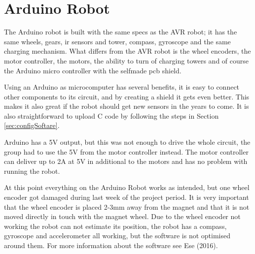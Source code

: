 \section{Arduino Robot}
The Arduino robot is built with the same specs as the AVR robot; it has the same wheels, gears, \acrshort{ir} sensors and tower, compass, gyroscope and the same charging mechanism. What differs from the AVR robot is the wheel encoders, the motor controller, the motors, the ability to turn of charging towers and of course the Arduino micro controller with the selfmade \acrshort{pcb} shield. 

Using an Arduino as microcomputer has several benefits, it is easy to connect other components to its circuit, and by creating a shield it gets even better. This makes it also great if the robot should get new sensors in the years to come. It is also straightforward to upload C code by following the steps in Section \ref{sec:configSoftare}. 

Arduino has a 5V output, but this was not enough to drive the whole circuit, the group had to use the 5V from the motor controller instead. The motor controller can deliver up to 2A at 5V in additional to the motors and has no problem with running the robot.

At this point everything on the Arduino Robot works as intended, but one wheel encoder got damaged during last week of the project period. It is very important that the wheel encoder is placed 2-3mm away from the magnet and that it is not moved directly in touch with the magnet wheel. Due to the wheel encoder not working the robot can not estimate its position, the robot has a compass, gyroscope and accelerometer all working, but the software is not optimised around them. For more information about the software see Ese (2016).
